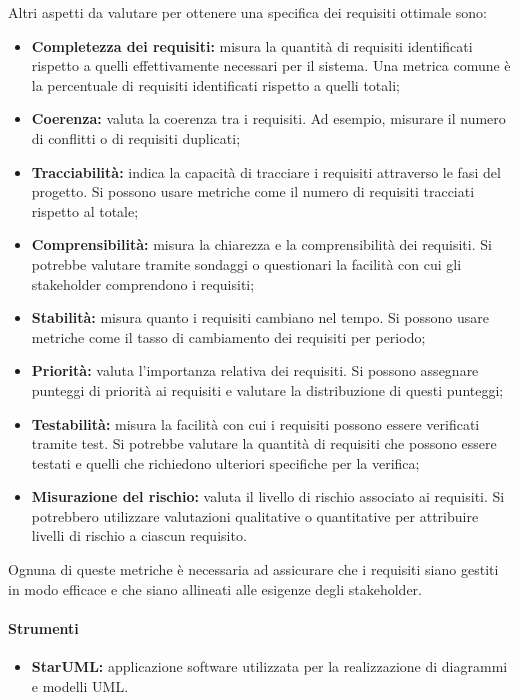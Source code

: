 Altri aspetti da valutare per ottenere una specifica dei requisiti ottimale sono: 
\begin{itemize}
    \item \textbf{Completezza dei requisiti:} misura la quantità di requisiti identificati rispetto a quelli effettivamente necessari per il sistema. Una metrica comune è la percentuale di requisiti identificati rispetto a quelli totali;
    \item \textbf{Coerenza:} valuta la coerenza tra i requisiti. Ad esempio, misurare il numero di conflitti o di requisiti duplicati;
    \item \textbf{Tracciabilità:} indica la capacità di tracciare i requisiti attraverso le fasi del progetto. Si possono usare metriche come il numero di requisiti tracciati rispetto al totale;
    \item \textbf{Comprensibilità:} misura la chiarezza e la comprensibilità dei requisiti. Si potrebbe valutare tramite sondaggi o questionari la facilità con cui gli stakeholder comprendono i requisiti;
    \item \textbf{Stabilità:} misura quanto i requisiti cambiano nel tempo. Si possono usare metriche come il tasso di cambiamento dei requisiti per periodo;
    \item \textbf{Priorità:} valuta l'importanza relativa dei requisiti. Si possono assegnare punteggi di priorità ai requisiti e valutare la distribuzione di questi punteggi;
    \item \textbf{Testabilità:} misura la facilità con cui i requisiti possono essere verificati tramite test. Si potrebbe valutare la quantità di requisiti che possono essere testati e quelli che richiedono ulteriori specifiche per la verifica;
    \item \textbf{Misurazione del rischio:} valuta il livello di rischio associato ai requisiti. Si potrebbero utilizzare valutazioni qualitative o quantitative per attribuire livelli di rischio a ciascun requisito.
\end{itemize}
Ognuna di queste metriche è necessaria ad assicurare che i requisiti siano gestiti in modo efficace e che siano allineati alle esigenze degli stakeholder.

\paragraph{Strumenti}
\begin{itemize}
    \item \textbf{StarUML:} applicazione software utilizzata per la realizzazione di diagrammi e modelli UML.
\end{itemize}

